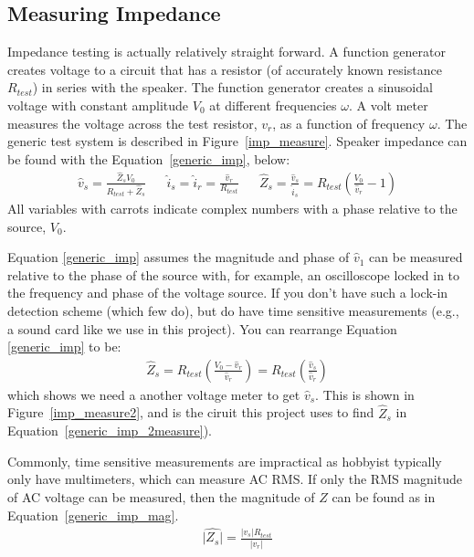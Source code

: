 \documentclass[10pt,letterpaper]{book}
\begin{document}
\subsection{Measuring Impedance}
Impedance testing is actually relatively straight forward. A function generator creates voltage to a circuit that has a resistor (of accurately known resistance $R_{test}$) in series with the speaker. The function generator creates a sinusoidal voltage with constant amplitude $V_0$ at different frequencies $\omega$. A volt meter measures the voltage across the test resistor, $v_r$, as a function of frequency $\omega$. The generic test system is described in Figure~\ref{imp_measure}. Speaker impedance can be found with the Equation~\ref{generic_imp}, below:
\begin{align}\label{generic_imp}
\hat{v}_s=\frac{ \hat{Z}_s V_0 }{ R_{test} + \hat{Z}_s } && \hat{i}_s=\hat{i}_r=\frac{\hat{v}_r}{R_{test}} && \hat{Z}_s=\frac{\hat{v}_s}{\hat{i}_s}=R_{test}\left( \frac{V_0}{\hat{v}_r} -1 \right)
\end{align}
All variables with carrots indicate complex numbers with a phase relative to the source, $V_0$.

Equation \ref{generic_imp} assumes the magnitude and phase of  $\hat{v}_1$ can be measured relative to the phase of the source with, for example, an oscilloscope locked in to the frequency and phase of the voltage source. If you don't have such a lock-in detection scheme (which few do), but do have time sensitive measurements (e.g., a sound card like we use in this project). You can rearrange Equation \ref{generic_imp} to be:
\begin{align}\label{generic_imp_2measure}
\hat{Z}_s=R_{test}\left( \frac{V_0 - \hat{v}_r}{\hat{v}_r}\right)=R_{test}\left( \frac{\hat{v}_s}{\hat{v}_r}\right)
\end{align}
which shows we need a another voltage meter to get $\hat{v}_s$. This is shown in Figure~\ref{imp_measure2}, and is the ciruit this project uses to find $\hat{Z}_s$ in Equation~\ref{generic_imp_2measure}).



Commonly, time sensitive measurements are impractical as hobbyist typically only have multimeters, which can measure AC RMS. If only the RMS magnitude of AC voltage can be measured, then the magnitude of $Z$ can be found as in Equation~\ref{generic_imp_mag}.
\begin{align}\label{generic_imp_mag}
\hat{\left|Z_s\right|}=\frac{\left| v_s \right| R_{test}}{\left| v_r \right|}
\end{align}
\end{document}
